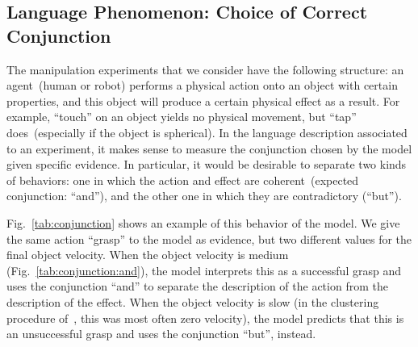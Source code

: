 \subsection{Language Phenomenon: Choice of Correct Conjunction}
\label{sec:results:conjunction}

\newcommand{\evidenceProducingAnd}{$\xobs=$\{ Action=grasp, ObjVel=medium \}}
\newcommand{\evidenceProducingBut}{$\xobs=$\{ Action=grasp, ObjVel=slow \}}

The manipulation experiments that we consider have the following structure: an agent~(human or robot) performs a physical action onto an object with certain properties, and this object will produce a certain physical effect as a result.
For example, ``touch'' on an object yields no physical movement, but ``tap'' does~(especially if the object is spherical).
In the language description associated to an experiment, it makes sense to measure the conjunction chosen by the model given specific evidence.
In particular, it would be desirable to separate two kinds of behaviors: one in which the action and effect are coherent~(expected conjunction: ``and''), and the other one in which they are contradictory (``but'').

Fig.~\ref{tab:conjunction} shows an example of this behavior of the model.
We give the same action ``grasp'' to the model as evidence, but two different values for the final object velocity.
When the object velocity is medium (Fig.~\ref{tab:conjunction:and}), the model interprets this as a successful grasp and uses the conjunction ``and'' to separate the description of the action from the description of the effect.
When the object velocity is slow (in the clustering procedure of~\cite{salvi:2012:smcb}, this was most often zero velocity), the model predicts that this is an unsuccessful grasp and uses the conjunction ``but'', instead.

